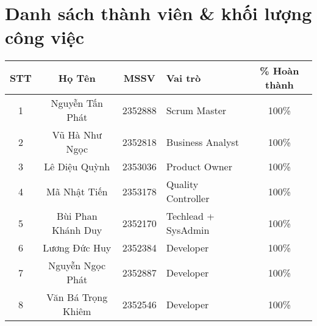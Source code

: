 \section*{Danh sách thành viên \& khối lượng công việc}
\begin{center}
\begin{table}[h]
\centering
\begin{tabular}{|c|c|c|l|c|}
\hline
\textbf{STT} & \textbf{Họ Tên} & \textbf{MSSV} & \textbf{Vai trò} & \textbf{\% Hoàn thành}\\
\hline 
\multirow{3}{*}{1} & \multirow{3}{*}{Nguyễn Tấn Phát} & \multirow{3}{*}{2352888} & 
\multirow{3}{*}{Scrum Master} & \multirow{3}{*}{100\%}\\
& &  & &\\
& &  & &\\
\hline 
\multirow{3}{*}{2} & \multirow{3}{*}{Vũ Hà Như Ngọc} & \multirow{3}{*}{2352818} & 
\multirow{3}{*}{Business Analyst} & \multirow{3}{*}{100\%}\\
& &  & &\\
& &  & &\\
\hline 
\multirow{3}{*}{3} & \multirow{3}{*}{Lê Diệu Quỳnh} & \multirow{3}{*}{2353036} & 
\multirow{3}{*}{Product Owner} & \multirow{3}{*}{100\%}\\
& &  & &\\
& &  & &\\
\hline 
\multirow{3}{*}{4} & \multirow{3}{*}{Mã Nhật Tiến} & \multirow{3}{*}{2353178} & 
\multirow{3}{*}{Quality Controller} & \multirow{3}{*}{100\%}\\
& &  & &\\
& &  & &\\
\hline 
\multirow{3}{*}{5} & \multirow{3}{*}{Bùi Phan Khánh Duy} & \multirow{3}{*}{2352170} & 
\multirow{3}{*}{Techlead + SysAdmin} & \multirow{3}{*}{100\%}\\
& &  & &\\
& &  & &\\
\hline 
\multirow{3}{*}{6} & \multirow{3}{*}{Lương Đức Huy} & \multirow{3}{*}{2352384} & 
\multirow{3}{*}{Developer} & \multirow{3}{*}{100\%}\\
& &  & &\\
& &  & &\\
\hline 
\multirow{3}{*}{7} & \multirow{3}{*}{Nguyễn Ngọc Phát} & \multirow{3}{*}{2352887} & 
\multirow{3}{*}{Developer} & \multirow{3}{*}{100\%}\\
& &  & &\\
& &  & &\\
\hline 
\multirow{3}{*}{8} & \multirow{3}{*}{Văn Bá Trọng Khiêm} & \multirow{3}{*}{2352546} & 
\multirow{3}{*}{Developer} & \multirow{3}{*}{100\%}\\
& &  & &\\
& &  & &\\
\hline 


\end{tabular}
\end{table}
\end{center}
